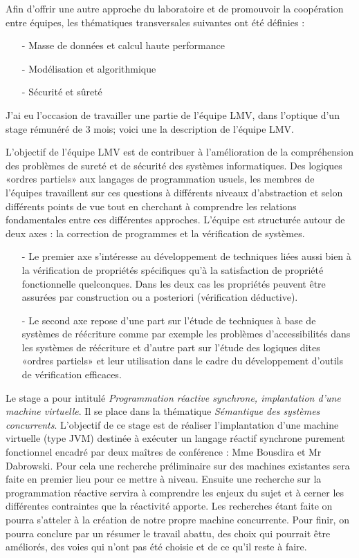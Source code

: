 \documentclass[10pt,a4paper]{article}
\begin{document}
		Afin d'offrir une autre approche du laboratoire et de promouvoir la coopération entre équipes, les thématiques transversales suivantes ont été définies :
		\begin{enumerate}
			\item[-] Masse de données et calcul haute performance
			\item[-] Modélisation et algorithmique
			\item[-] Sécurité et sûreté
		\end{enumerate}
		\medbreak
		
		J'ai eu l'occasion de travailler une partie de l'équipe LMV, dans l'optique d'un stage rémunéré de 3 mois; voici une la description de l'équipe LMV.
		\medbreak
		
		L'objectif de l'équipe LMV est de contribuer à l'amélioration de la compréhension des problèmes de sureté et de sécurité des systèmes  informatiques. Des logiques «ordres partiels» aux langages de programmation usuels, les membres de l'équipes travaillent sur ces questions à différents niveaux d'abstraction et selon différents points de vue tout en cherchant à comprendre les relations fondamentales entre ces différentes approches. L'équipe est structurée autour de deux axes : la correction de programmes et la vérification de systèmes.
		\begin{enumerate}
			\item[-] Le premier axe s'intéresse au développement de techniques liées aussi bien à la vérification de propriétés spécifiques qu'à la satisfaction de propriété fonctionnelle quelconques. Dans les deux cas les propriétés peuvent être assurées par construction ou a posteriori (vérification déductive).
			\item[-] Le second axe repose d'une part sur l'étude de techniques à base de systèmes de réécriture comme par exemple les problèmes d'accessibilités dans les systèmes de réécriture et d'autre part sur l'étude des logiques dites «ordres partiels» et leur utilisation dans le cadre du développement d'outils de vérification efficaces.
		\end{enumerate}
		\bigbreak
		
		Le stage a pour intitulé \textit{Programmation réactive synchrone, implantation d’une machine virtuelle}. Il se place dans la thématique \textit{Sémantique des systèmes concurrents}. L’objectif de ce stage est de réaliser l’implantation d’une machine virtuelle (type JVM) destinée à exécuter un langage réactif synchrone purement fonctionnel encadré par deux maîtres de conférence : Mme Bousdira et Mr Dabrowski.
		\smallbreak
		Pour cela une recherche préliminaire sur des machines existantes sera faite en premier lieu pour ce mettre à niveau. Ensuite une recherche sur la programmation réactive servira à comprendre les enjeux du sujet et à cerner les différentes contraintes que la réactivité apporte. Les recherches étant faite on pourra s'atteler à la création de notre propre machine concurrente. Pour finir, on pourra conclure par un résumer le travail abattu, des choix qui pourrait être améliorés, des voies qui n'ont pas été choisie et de ce qu'il reste à faire.
	\newpage
		
\end{document}

